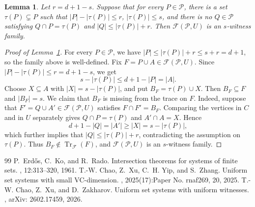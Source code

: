 \documentclass[10pt,a4paper]{amsart}
\newtheorem{lemma}[theorem]{Lemma}
\newcommand{\cP}{\mathcal{P}}
\newcommand{\cF}{\mathcal{F}}
\newcommand{\Tr}{\operatorname{Tr}}
\begin{document}
\begin{lemma}\label{lem:criterion}
Let \(r=d+1-s\). Suppose that for every \(P\in\cP\), there is a set \(\tau(P)\subsetneq P\) such that \(|P|-|\tau(P)|\le r\), \(|\tau(P)|\le s\), and there is no \(Q\in\cP\) satisfying
\(
Q\cap P=\tau(P)\) and \(|Q|\le |\tau(P)|+r.\)
Then \(\cF(\cP,U)\) is an \(s\)-witness family.
\end{lemma}

\begin{proof}[Proof of Lemma~\ref{lem:criterion}]
For every \(P\in\cP\), we have \(|P|\le |\tau(P)|+r\le s+r=d+1\), so the family above is well-defined. Fix \(F=P\cup A\in\cF(\cP,U)\). Since \(|P|-|\tau(P)|\le r=d+1-s\), we get
\[
s-|\tau(P)|\le d+1-|P|=|A|.
\]
Choose \(X\subseteq A\) with \(|X|=s-|\tau(P)|\), and put \(B_F=\tau(P)\cup X\). Then \(B_F\subseteq F\) and \(|B_F|=s\). We claim that \(B_F\) is missing from the trace on \(F\). Indeed, suppose that \(F'=Q\cup A'\in\cF(\cP,U)\) satisfies \(F\cap F'=B_F\). Comparing the vertices in \(C\) and in \(U\) separately gives
\(Q\cap P=\tau(P)\) and \(A'\cap A=X.\)
Hence
\[
d+1-|Q|=|A'|\ge |X|=s-|\tau(P)|,
\]
which further implies that \(|Q|\le |\tau(P)|+r\), contradicting the assumption on \(\tau(P)\). Thus \(B_F\notin\Tr_{\cF}(F)\), and \(\cF(\cP,U)\) is an \(s\)-witness family.
\end{proof}


\begin{thebibliography}{99}
 P.~Erd\H{o}s, C.~Ko, and R.~Rado. \newblock Intersection theorems for systems of finite sets. , 12:313--320, 1961.
 T.-W. Chao, Z.~Xu, C.~H. Yip, and S.~Zhang. \newblock Uniform set systems with small {VC}-dimension. , 2025(17):Paper No. rnaf269, 20, 2025.
 T.-W. Chao, Z.~Xu, and D.~Zakharov. \newblock Uniform set systems with uniform witnesses. , arXiv: 2602.17459, 2026.
\end{thebibliography}
\end{document}

